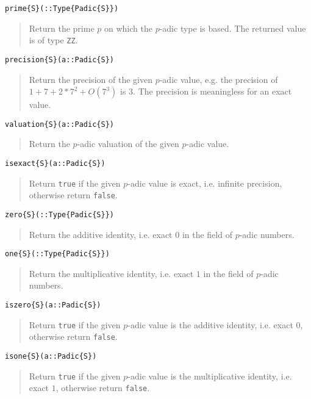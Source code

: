 \documentclass[a4paper,10pt]{article}
\newcommand{\code}{\lstinline}
\newcommand{\desc}[1]{\vspace{-3mm}\begin{quote}#1\end{quote}}
\begin{document}
{{\begin{lstlisting}
prime{S}(::Type{Padic{S}})
\end{lstlisting}

\desc{Return the prime $p$ on which the $p$-adic type is based. The returned
value is of type \code{ZZ}.}

\begin{lstlisting}
precision{S}(a::Padic{S})
\end{lstlisting}

\desc{Return the precision of the given $p$-adic value, e.g. the precision of
$1 + 7 + 2*7^2 + O(7^3)$ is $3$. The precision is meaningless for an
exact value.}

\begin{lstlisting}
valuation{S}(a::Padic{S})
\end{lstlisting}

\desc{Return the $p$-adic valuation of the given $p$-adic value.}

\begin{lstlisting}
isexact{S}(a::Padic{S})
\end{lstlisting}

\desc{Return \code{true} if the given $p$-adic value is exact, i.e. infinite
precision, otherwise return \code{false}.}

\begin{lstlisting}
zero{S}(::Type{Padic{S}})
\end{lstlisting}

\desc{Return the additive identity, i.e. exact $0$ in the field of $p$-adic
numbers.}

\begin{lstlisting}
one{S}(::Type{Padic{S}})
\end{lstlisting}

\desc{Return the multiplicative identity, i.e. exact $1$ in the field of
$p$-adic numbers.}

\begin{lstlisting}
iszero{S}(a::Padic{S})
\end{lstlisting}

\desc{Return \code{true} if the given $p$-adic value is the additive identity,
i.e. exact $0$, otherwise return \code{false}.}

\begin{lstlisting}
isone{S}(a::Padic{S})
\end{lstlisting}

\desc{Return \code{true} if the given $p$-adic value is the multiplicative
identity, i.e. exact $1$, otherwise return \code{false}.}

}}
\end{document}
